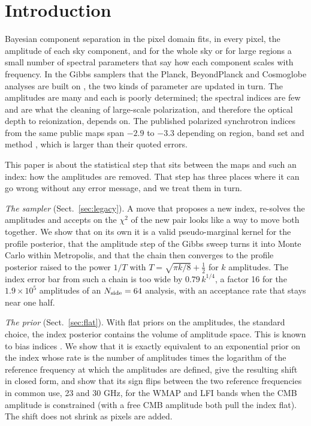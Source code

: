 \section{Introduction}

Bayesian component separation in the pixel domain fits, in every pixel, the amplitude of each sky
component, and for the whole sky or for large regions a small number of spectral parameters that say
how each component scales with frequency. In the Gibbs samplers that the Planck, BeyondPlanck and
Cosmoglobe analyses are built on \citep{eriksen2008,svalheim2023,watts2023}, the two kinds of
parameter are updated in turn. The amplitudes are many and each is poorly determined; the spectral
indices are few and are what the cleaning of large-scale polarization, and therefore the optical
depth to reionization, depends on. The published polarized synchrotron indices from the same public
maps span $-2.9$ to $-3.3$ depending on region, band set and method
\citep{dunkley2009,fuskeland2014,svalheim2023,weiland2022}, which is larger than their quoted errors.

This paper is about the statistical step that sits between the maps and such an index: how the
amplitudes are removed. That step has three places where it can go wrong without any error message,
and we treat them in turn.

\emph{The sampler} (Sect.~\ref{sec:legacy}). A move that proposes a new index, re-solves the
amplitudes and accepts on the $\chi^2$ of the new pair looks like a way to move both together. We
show that on its own it is a valid pseudo-marginal kernel for the profile posterior, that the
amplitude step of the Gibbs sweep turns it into Monte Carlo within Metropolis, and that the chain
then converges to the profile posterior raised to the power $1/T$ with
$T = \sqrt{\pi k/8} + \tfrac12$ for $k$ amplitudes. The index error bar from such a chain is too wide
by $0.79\,k^{1/4}$, a factor 16 for the $1.9\times10^5$ amplitudes of an $N_{\rm side}=64$ analysis,
with an acceptance rate that stays near one half.

\emph{The prior} (Sect.~\ref{sec:flat}). With flat priors on the amplitudes, the standard choice, the
index posterior contains the volume of amplitude space. This is known to bias indices
\citep{eriksen2008,dunkley2009,alonso2017}. We show that it is exactly equivalent to an exponential
prior on the index whose rate is the number of amplitudes times the logarithm of the reference
frequency at which the amplitudes are defined, give the resulting shift in closed form, and show that
its sign flips between the two reference frequencies in common use, 23 and 30 GHz, for the WMAP and
LFI bands when the CMB amplitude is constrained (with a free CMB amplitude both pull the index flat).
The shift does not shrink as pixels are added.

